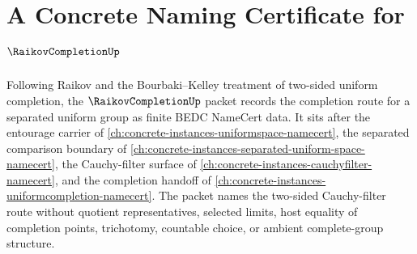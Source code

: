 \chapter{A Concrete Naming Certificate for $\RaikovCompletionUp$}
\label{ch:concrete-instances-raikov-completion-namecert}

Following Raikov and the Bourbaki--Kelley treatment of two-sided uniform completion, the $\RaikovCompletionUp$ packet records the completion route for a separated uniform group as finite BEDC NameCert data. It sits after the entourage carrier of \autoref{ch:concrete-instances-uniformspace-namecert}, the separated comparison boundary of \autoref{ch:concrete-instances-separated-uniform-space-namecert}, the Cauchy-filter surface of \autoref{ch:concrete-instances-cauchyfilter-namecert}, and the completion handoff of \autoref{ch:concrete-instances-uniformcompletion-namecert}. The packet names the two-sided Cauchy-filter route without quotient representatives, selected limits, host equality of completion points, trichotomy, countable choice, or ambient complete-group structure.


